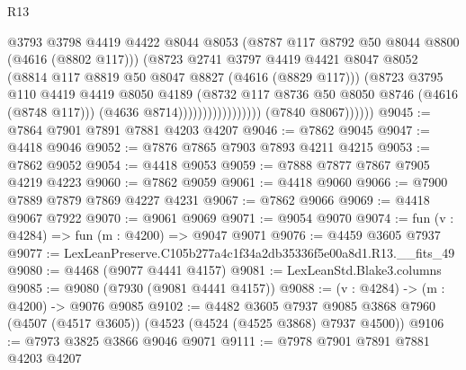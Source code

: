 \begin{lexlean}{R13}
\begin{coremodule}
                                          @3793
                                          @3798
                                          @4419
                                          @4422
                                          @8044
                                          @8053
                                          (@8787 @117 @8792 @50 @8044 @8800 (@4616 (@8802 @117)))
                                          (@8723
                                            @2741
                                            @3797
                                            @4419
                                            @4421
                                            @8047
                                            @8052
                                            (@8814 @117 @8819 @50 @8047 @8827 (@4616 (@8829 @117)))
                                            (@8723
                                              @3795
                                              @110
                                              @4419
                                              @4419
                                              @8050
                                              @4189
                                              (@8732
                                                @117
                                                @8736
                                                @50
                                                @8050
                                                @8746
                                                (@4616 (@8748 @117)))
                                              (@4636 @8714)))))))))))))))))
              (@7840 @8067))))))
@9045 := @7864 @7901 @7891 @7881 @4203 @4207
@9046 := @7862 @9045
@9047 := @4418 @9046
@9052 := @7876 @7865 @7903 @7893 @4211 @4215
@9053 := @7862 @9052
@9054 := @4418 @9053
@9059 := @7888 @7877 @7867 @7905 @4219 @4223
@9060 := @7862 @9059
@9061 := @4418 @9060
@9066 := @7900 @7889 @7879 @7869 @4227 @4231
@9067 := @7862 @9066
@9069 := @4418 @9067 @7922
@9070 := @9061 @9069
@9071 := @9054 @9070
@9074 := fun (v : @4284) => fun (m : @4200) => @9047 @9071
@9076 := @4459 @3605 @7937
@9077 := LexLeanPreserve.C105b277a4c1f34a2db35336f5e00a8d1.R13.__fits_49
@9080 := @4468 (@9077 @4441 @4157)
@9081 := LexLeanStd.Blake3.columns
@9085 := @9080 (@7930 (@9081 @4441 @4157))
@9088 := (v : @4284) -> (m : @4200) -> @9076 @9085
@9102 := @4482
    @3605
    @7937
    @9085
    @3868
    @7960
    (@4507 (@4517 @3605))
    (@4523 (@4524 (@4525 @3868) @7937 @4500))
@9106 := @7973 @3825 @3866 @9046 @9071
@9111 := @7978 @7901 @7891 @7881 @4203 @4207

\end{coremodule}
\end{lexlean}
